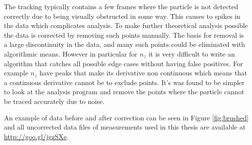 \label{sec:brushing}
The tracking typically contains a few frames where the particle is not detected correctly due to being visually obstructed in some way. This causes to spikes in the data which complicates analysis. To make further theoretical analysis possible the data is corrected by removing such points manually. The basis for removal is a large discontinuity in the data, and many such points could be eliminated with algorithmic means. However in particular for $n_z$ it is very difficult to write an algorithm that catches all possible edge cases without having false positives. For example $n_z$ have peaks that make its derivative non continuous which means that a continuous derivative cannot be to exclude points. It's was found to be simpler to look at the analysis program and remove the points where the particle cannot be traced accurately due to noise. 

An example of data before and after correction can be seen in Figure \ref{fig:brushed} and all uncorrected data files of measurements used in this thesis are available at \url{http://goo.gl/jgzSXe}.

